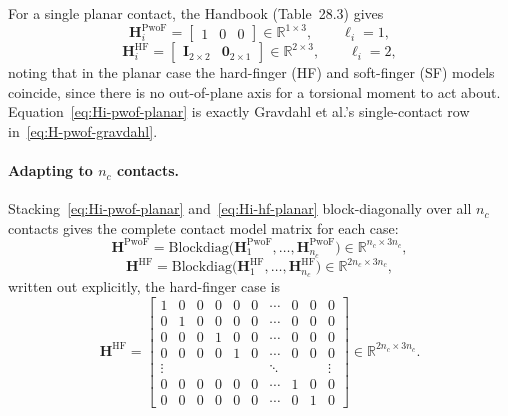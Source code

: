 For a single planar contact, the Handbook (Table~28.3) gives
\begin{equation}
    \boldsymbol{H}_i^{\mathrm{PwoF}} = \begin{bmatrix} 1 & 0 & 0 \end{bmatrix} \in \mathbb{R}^{1\times3} , \qquad \ell_i = 1 ,
    \label{eq:Hi-pwof-planar}
\end{equation}
\begin{equation}
    \boldsymbol{H}_i^{\mathrm{HF}} = \begin{bmatrix} \boldsymbol{I}_{2\times2} & \boldsymbol{0}_{2\times1} \end{bmatrix} \in \mathbb{R}^{2\times3} , \qquad \ell_i = 2 ,
    \label{eq:Hi-hf-planar}
\end{equation}
noting that in the planar case the hard-finger (HF) and soft-finger (SF)
models coincide, since there is no out-of-plane axis for a torsional moment
to act about. Equation~\eqref{eq:Hi-pwof-planar} is exactly
Gravdahl et al.'s single-contact row in~\eqref{eq:H-pwof-gravdahl}.

\paragraph{Adapting to $n_c$ contacts.}
Stacking~\eqref{eq:Hi-pwof-planar} and~\eqref{eq:Hi-hf-planar} block-diagonally
over all $n_c$ contacts gives the complete contact model matrix for each
case:
\begin{equation}
    \boldsymbol{H}^{\mathrm{PwoF}} = \mathrm{Blockdiag}\big(\boldsymbol{H}_1^{\mathrm{PwoF}}, \ldots, \boldsymbol{H}_{n_c}^{\mathrm{PwoF}}\big) \in \mathbb{R}^{n_c \times 3n_c} ,
    \label{eq:H-pwof-nc}
\end{equation}
\begin{equation}
    \boldsymbol{H}^{\mathrm{HF}} = \mathrm{Blockdiag}\big(\boldsymbol{H}_1^{\mathrm{HF}}, \ldots, \boldsymbol{H}_{n_c}^{\mathrm{HF}}\big) \in \mathbb{R}^{2n_c \times 3n_c} ,
    \label{eq:H-hf-nc}
\end{equation}
written out explicitly, the hard-finger case is
\begin{equation}
    \boldsymbol{H}^{\mathrm{HF}} =
    \left[\begin{array}{ccc|ccc|c|ccc}
        1 & 0 & 0 & 0 & 0 & 0 & \cdots & 0 & 0 & 0 \\
        0 & 1 & 0 & 0 & 0 & 0 & \cdots & 0 & 0 & 0 \\
        0 & 0 & 0 & 1 & 0 & 0 & \cdots & 0 & 0 & 0 \\
        0 & 0 & 0 & 0 & 1 & 0 & \cdots & 0 & 0 & 0 \\
        \vdots & & & & & & \ddots & & & \vdots \\
        0 & 0 & 0 & 0 & 0 & 0 & \cdots & 1 & 0 & 0 \\
        0 & 0 & 0 & 0 & 0 & 0 & \cdots & 0 & 1 & 0
    \end{array}\right] \in \mathbb{R}^{2n_c \times 3n_c} .
    \label{eq:H-hf-nc-explicit}
\end{equation}

